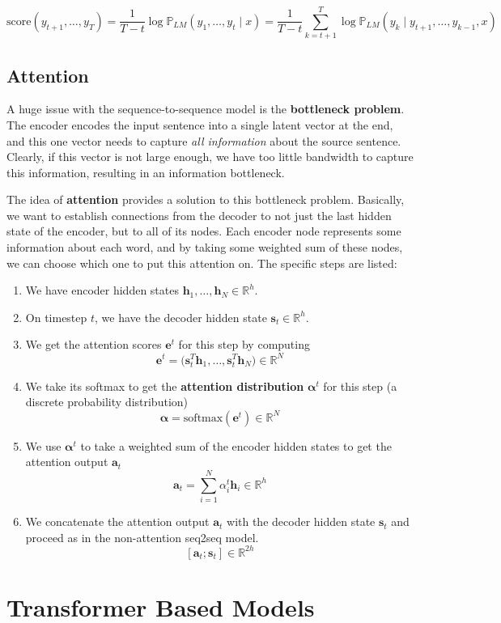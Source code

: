 \documentclass{article}
\begin{document}
    \[\mathrm{score}(y_{t+1}, \ldots, y_T) = \frac{1}{T-t} \log \mathbb{P}_{LM} (y_1, \ldots, y_t \mid x) = \frac{1}{T-t} \sum_{k=t+1}^T \log \mathbb{P}_{LM} ( y_k \mid y_{t+1}, \ldots, y_{k-1}, x) \]

  \subsection{Attention}

    A huge issue with the sequence-to-sequence model is the \textbf{bottleneck problem}. The encoder encodes the input sentence into a single latent vector at the end, and this one vector needs to capture \textit{all information} about the source sentence. Clearly, if this vector is not large enough, we have too little bandwidth to capture this information, resulting in an information bottleneck. 

    The idea of \textbf{attention} provides a solution to this bottleneck problem. Basically, we want to establish connections from the decoder to not just the last hidden state of the encoder, but to all of its nodes. Each encoder node represents some information about each word, and by taking some weighted sum of these nodes, we can choose which one to put this attention on. The specific steps are listed: 
    \begin{enumerate}
        \item We have encoder hidden states $\mathbf{h}_1, \ldots, \mathbf{h}_N \in \mathbb{R}^h$. 
        \item On timestep $t$, we have the decoder hidden state $\mathbf{s}_t \in \mathbb{R}^h$.  
        \item We get the attention scores $\mathbf{e}^t$ for this step by computing 
        \[\mathbf{e}^t = \big( \mathbf{s}_t^T \mathbf{h}_1 , \ldots, \mathbf{s}_t^T \mathbf{h}_N \big) \in \mathbb{R}^N\]
        \item We take its softmax to get the \textbf{attention distribution} $\boldsymbol{\alpha}^t$ for this step (a discrete probability distribution) 
        \[\boldsymbol{\alpha} = \mathrm{softmax} (\mathbf{e}^t) \in \mathbb{R}^N\]

        \item We use $\boldsymbol{\alpha}^t$ to take a weighted sum of the encoder hidden states to get the attention output $\mathbf{a}_t$ 
        \[\mathbf{a}_t = \sum_{i=1}^N \alpha_i^t \mathbf{h}_i \in \mathbb{R}^h\]

        \item We concatenate the attention output $\mathbf{a}_t$ with the decoder hidden state $\mathbf{s}_t$ and proceed as in the non-attention seq2seq model. 
        \[[\mathbf{a}_t ; \mathbf{s}_t ] \in \mathbb{R}^{2h}\]
    \end{enumerate}

\section{Transformer Based Models}



\end{document}
